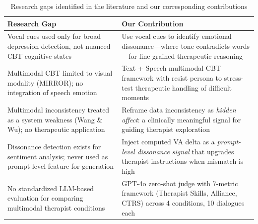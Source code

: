 \begin{table}[hbt!]
\caption{Research gaps identified in the literature and our corresponding contributions}
\begin{tabular}{p{3.5cm}p{5.5cm}}
\hline
\textbf{Research Gap} & \textbf{Our Contribution} \\ \hline
Vocal cues used only for broad depression detection, not nuanced CBT cognitive states
    & Use vocal cues to identify emotional dissonance---where tone contradicts words---for fine-grained therapeutic reasoning \\ \hline
Multimodal CBT limited to visual modality (MIRROR); no integration of speech emotion
    & Text + Speech multimodal CBT framework with resist persona to stress-test therapeutic handling of difficult moments \\ \hline
Multimodal inconsistency treated as a system weakness (Wang \& Wu); no therapeutic application
    & Reframe data inconsistency as \emph{hidden affect}: a clinically meaningful signal for guiding therapist exploration \\ \hline
Dissonance detection exists for sentiment analysis; never used as prompt-level feature for generation
    & Inject computed VA delta as a \emph{prompt-level dissonance signal} that upgrades therapist instructions when mismatch is high \\ \hline
No standardized LLM-based evaluation for comparing multimodal therapist conditions
    & GPT-4o zero-shot judge with 7-metric framework (Therapist Skills, Alliance, CTRS) across 4 conditions, 10 dialogues each \\ \hline
\end{tabular}
\label{tab:research-gaps}
\end{table}